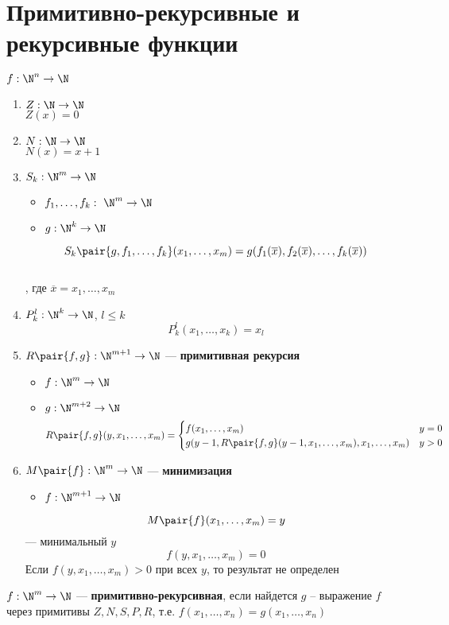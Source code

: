 \documentclass[english]{article}
\begin{document}
\section{Примитивно-рекурсивные и рекурсивные функции}
\label{sec:org96a6284}
\begin{definition}
	\(f: \N^n \to \N\)
	\begin{enumerate}
		\item \(Z: \N \to \N\) \\
		      \(Z(x) = 0\)
		\item \(N: \N \to \N\) \\
		      \(N(x) = x + 1\)
		\item \(S_k: \N^m \to \N\)
		      \begin{itemize}
			      \item \(f_1, \dots, f_k:\ \N^m \to \N\)
			      \item \(g: \N^k \to \N\)
		      \end{itemize}
		      \[S_k \pair{g, f_1, \dots, f_k}(x_1,\dots,x_m) = g(f_1(\overline{x}), f_2(\overline{x}),\dots,f_k(\overline{x}))\] \\
		      , где \(\overline{x} = x_1,\dots,x_m\)
		\item \(P^l_k: \N^k \to \N\), \(l \le k\)
		      \[ P^l_k(x_1, \dots, x_k) = x_l \]
		\item \(R\pair{f, g}: \N^{m + 1} \to \N\) --- \textbf{примитивная рекурсия}
		      \begin{itemize}
			      \item \(f: \N^m \to \N\)
			      \item \(g: \N^{m + 2} \to \N\)
			            \[ R\pair{f, g}(y, x_1, \dots, x_m) = \begin{cases}
					            f(x_1, \dots, x_m)                                              & y = 0 \\
					            g(y - 1, R\pair{f, g}(y - 1, x_1, \dots, x_m), x_1, \dots, x_m) & y > 0
				            \end{cases} \]
		      \end{itemize}
	\end{enumerate}
	\label{org61312a9}
\end{definition}
\begin{definition}
	\-
	\begin{enumerate}
		\setcounter{enumi}{5}
		\item \(M\pair{f}: \N^m \to \N\) --- \textbf{минимизация}
		      \begin{itemize}
			      \item \(f: \N^{m + 1} \to \N\)
		      \end{itemize}
		      \[ M\pair{f}(x_1, \dots, x_m) = y \]
		      --- минимальный \(y\)
		      \[ f(y, x_1, \dots, x_m) = 0 \]
		      Если \(f(y, x_1, \dots, x_m) > 0\) при всех \(y\), то результат не определен
	\end{enumerate}
	\label{orgc7e0b3b}
\end{definition}
\begin{definition}
	\(f: \N^m \to \N\) --- \textbf{примитивно-рекурсивная}, если найдется \(g\) -- выражение \(f\) через примитивы \(Z, N, S, P, R\), т.е. \(f(x_1, \dots, x_n) = g(x_1, \dots, x_n)\)
	\label{org4f4939d}
\end{definition}
\end{document}
